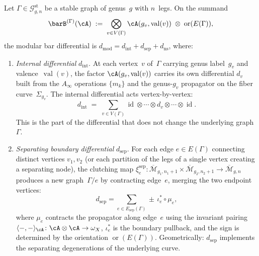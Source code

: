 \begin{definition}
\label{def:three-component-modular-bar}
Let $\Gamma \in \mathcal{G}^{\mathrm{st}}_{g,n}$ be a stable graph
of genus~$g$ with $n$~legs.  On the summand
\[
\barB^{(\Gamma)}(\cA)
\;:=\;
\bigotimes_{v \in V(\Gamma)} \cA(g_v, \operatorname{val}(v))
\;\otimes\; \operatorname{or}(E(\Gamma)),
\]
the modular bar differential is
$d_{\mathrm{mod}} = d_{\mathrm{int}} + d_{\mathrm{sep}} + d_{\mathrm{ns}}$,
where:
\begin{enumerate}[label=\textup{(\roman*)}]
\item \emph{Internal differential} $d_{\mathrm{int}}$.
  At each vertex~$v$ of~$\Gamma$ carrying genus label~$g_v$ and
  valence~$\operatorname{val}(v)$, the factor
  $\cA(g_v, \operatorname{val}(v))$ carries its own differential
  $d_v$ built from the $A_\infty$ operations $\{m_k\}$ and the
  genus-$g_v$ propagator on the fiber curve~$\Sigma_{g_v}$.
  The internal differential acts vertex-by-vertex:
  \begin{equation}\label{eq:d-int}
  d_{\mathrm{int}}
  \;=\;
  \sum_{v \in V(\Gamma)}
  \operatorname{id} \otimes \cdots \otimes d_v
  \otimes \cdots \otimes \operatorname{id}.
  \end{equation}
  This is the part of the differential that does not change the
  underlying graph~$\Gamma$.

\item \emph{Separating boundary differential} $d_{\mathrm{sep}}$.
  For each edge $e \in E(\Gamma)$ connecting distinct vertices
  $v_1, v_2$ (or each partition of the legs of a single vertex
  creating a separating node), the clutching map
  $\xi_{e}^{\mathrm{sep}}\colon
  \overline{\mathcal{M}}_{g_1, n_1+1} \times
  \overline{\mathcal{M}}_{g_2, n_2+1} \to
  \overline{\mathcal{M}}_{g, n}$
  produces a new graph~$\Gamma/e$ by contracting edge~$e$,
  merging the two endpoint vertices:
  \begin{equation}\label{eq:d-sep}
  d_{\mathrm{sep}} = \sum_{e \in E_{\mathrm{sep}}(\Gamma)}
  \pm\, \iota_e^* \circ \mu_e,
  \end{equation}
  where $\mu_e$ contracts the propagator along edge~$e$ using the
  invariant pairing
  $\langle -, - \rangle_\cA\colon \cA \otimes \cA \to \omega_X$,
  $\iota_e^*$ is the boundary pullback, and the sign is determined
  by the orientation $\operatorname{or}(E(\Gamma))$.
  Geometrically: $d_{\mathrm{sep}}$ implements the separating
  degenerations of the underlying curve.


\end{enumerate}
\end{definition}
